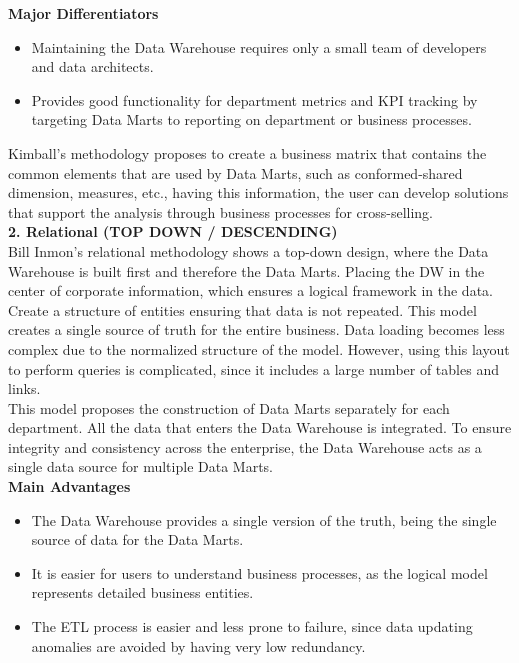 \documentclass[twocolumn]{article}
\begin{document}
\textbf{Major Differentiators}
\begin{itemize}
    \item Maintaining the Data Warehouse requires only a small team of developers and data architects.
    \item Provides good functionality for department metrics and KPI tracking by targeting Data Marts to reporting on department or business processes.
\end{itemize}
\begin{center}
\end{center}
Kimball's methodology proposes to create a business matrix that contains the common elements that are used by Data Marts, such as conformed-shared dimension, measures, etc., having this information, the user can develop solutions that support the analysis through business processes for cross-selling.\\[0.1in]

\noindent\textbf{\large 2. Relational (TOP DOWN / DESCENDING)}\\[0.1in]
Bill Inmon's relational methodology shows a top-down design, where the Data Warehouse is built first and therefore the Data Marts. Placing the DW in the center of corporate information, which ensures a logical framework in the data.\\[0.1in]
Create a structure of entities ensuring that data is not repeated. This model creates a single source of truth for the entire business. Data loading becomes less complex due to the normalized structure of the model. However, using this layout to perform queries is complicated, since it includes a large number of tables and links.\\[0.1in]
This model proposes the construction of Data Marts separately for each department. All the data that enters the Data Warehouse is integrated. To ensure integrity and consistency across the enterprise, the Data Warehouse acts as a single data source for multiple Data Marts.\\[0.1in]
\textbf{Main Advantages}
\begin{itemize}
    \item The Data Warehouse provides a single version of the truth, being the single source of data for the Data Marts.
    \item It is easier for users to understand business processes, as the logical model represents detailed business entities.
    \item The ETL process is easier and less prone to failure, since data updating anomalies are avoided by having very low redundancy.
\end{itemize}
\end{document}
